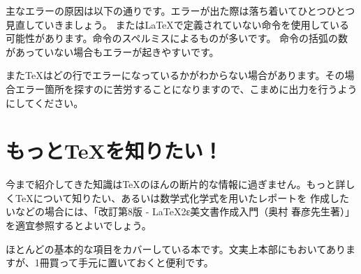 \begin{multicols*}{2}
主なエラーの原因は以下の通りです。エラーが出た際は落ち着いてひとつひとつ見直していきましょう。
\BunTeX または\LaTeX で定義されていない命令を使用している可能性があります。命令のスペルミスによるものが多いです。
命令の括弧の数があっていない場合もエラーが起きやすいです。

また\TeX はどの行でエラーになっているかがわからない場合があります。その場合エラー箇所を探すのに苦労することになりますので、こまめに出力を行うようにしてください。

\section{もっと\TeX を知りたい！}
今まで紹介してきた知識は\TeX のほんの断片的な情報に過ぎません。もっと詳しく\TeX について知りたい、あるいは数学式化学式を用いたレポートを
作成したいなどの場合には、「改訂第8版 - LaTeX2ε美文書作成入門（奥村 春彦先生著）」を適宜参照するとよいでしょう。

ほとんどの基本的な項目をカバーしている本です。文実上本部にもおいてありますが、1冊買って手元に置いておくと便利です。

\end{multicols*}